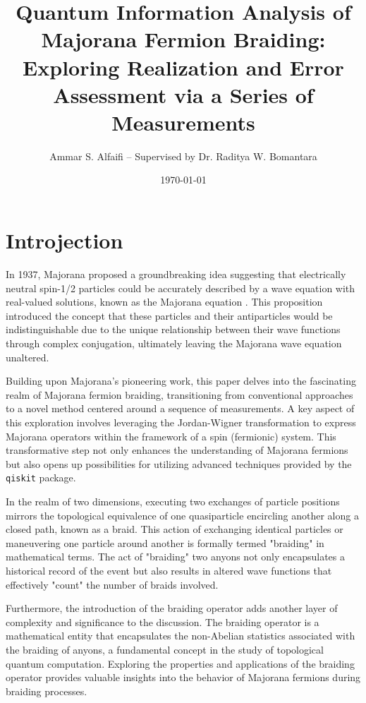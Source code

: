 \documentclass{article}
\title{Quantum Information Analysis of Majorana Fermion Braiding: Exploring Realization and Error Assessment via a Series of Measurements}
\author{Ammar S. Alfaifi -- Supervised by Dr. Raditya W. Bomantara}
\date{\today}
\def\c#1{\texttt{#1}}
\begin{document}
\maketitle

\section{Introjection} %
In 1937, Majorana proposed a groundbreaking idea suggesting that electrically neutral spin-1/2 particles could be accurately described by a wave equation with real-valued solutions, known as the Majorana equation \cite{Majorana2006}. This proposition introduced the concept that these particles and their antiparticles would be indistinguishable due to the unique relationship between their wave functions through complex conjugation, ultimately leaving the Majorana wave equation unaltered.

Building upon Majorana's pioneering work, this paper delves into the fascinating realm of Majorana fermion braiding, transitioning from conventional approaches to a novel method centered around a sequence of measurements. A key aspect of this exploration involves leveraging the Jordan-Wigner transformation to express Majorana operators within the framework of a spin (fermionic) system. This transformative step not only enhances the understanding of Majorana fermions but also opens up possibilities for utilizing advanced techniques provided by the \c{qiskit} package.

In the realm of two dimensions, executing two exchanges of particle positions mirrors the topological equivalence of one quasiparticle encircling another along a closed path, known as a braid. This action of exchanging identical particles or maneuvering one particle around another is formally termed "braiding" in mathematical terms. The act of "braiding" two anyons not only encapsulates a historical record of the event but also results in altered wave functions that effectively "count" the number of braids involved.\cite{Nakamura_2020}

Furthermore, the introduction of the braiding operator adds another layer of complexity and significance to the discussion. The braiding operator is a mathematical entity that encapsulates the non-Abelian statistics associated with the braiding of anyons, a fundamental concept in the study of topological quantum computation. Exploring the properties and applications of the braiding operator provides valuable insights into the behavior of Majorana fermions during braiding processes.
\end{document}

